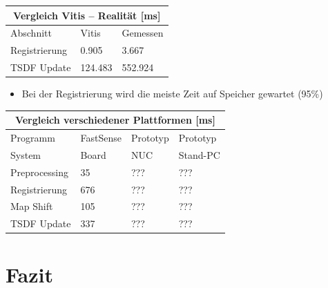 \documentclass{beamer}
\begin{document}
\begin{frame}{\subsecname}
\centering
\begin{tabular}{ |l||l|l|  }
 \hline
 \multicolumn{3}{|c|}{Vergleich Vitis -- Realität [ms]} \\
 \hline
 Abschnitt      & Vitis & Gemessen\\
 \hline
 Registrierung  & 0.905 & 3.667 \\
 TSDF Update    & 124.483 & 552.924 \\
 \hline
\end{tabular}
\begin{itemize}
\item{Bei der Registrierung wird die meiste Zeit auf Speicher gewartet (95\%)}
\end{itemize}
\end{frame}

\begin{frame}{\subsecname}
\centering
\begin{tabular}{ |p{3cm}||p{2cm}|p{2cm}|p{2cm}|  }
 \hline
 \multicolumn{4}{|c|}{Vergleich verschiedener Plattformen [ms]} \\
 \hline
 Programm       & FastSense & Prototyp & Prototyp \\
 \hline
 System         &     Board &    NUC   & Stand-PC \\
 \hline
 Preprocessing  &        35 &      ??? &      ??? \\
 Registrierung  &       676 &      ??? &      ??? \\
 Map Shift      &       105 &      ??? &      ??? \\
 TSDF Update    &       337 &      ??? &      ??? \\
\hline
\end{tabular}
\end{frame}



\section{Fazit}
\begin{frame}{}
\begin{center}
\end{center}
\end{frame}
\end{document}
